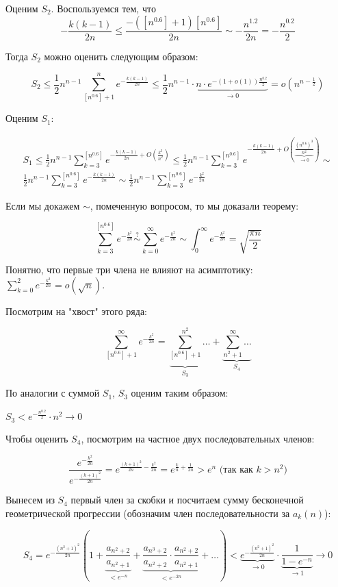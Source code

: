 Оценим $S_2$. Воспользуемся тем, что 
$$
-\frac{k(k - 1)}{2n} \leqslant \frac{-([n^{0.6}] + 1) [n^{0.6}]}{2n} \sim
-\frac{n^{1.2}}{2n} = -\frac{n^{0.2}}{2}
$$

Тогда $S_2$ можно оценить следующим образом:

$$
S_2 \leqslant \frac{1}{2} n^{n - 1} \sum_{[n^{0.6}] + 1}^{n} 
e^{-\frac{k(k - 1)}{2n}} \leqslant
\frac{1}{2} n^{n - 1} \cdot
\underbrace{n \cdot e^{-(1 + o(1)) \frac{n^{0.2}}{2}}}_{\to 0} 
= o \left( n^{n - \frac{1}{2}} \right)
$$

Оценим $S_1$:

\begin{multline*}
S_1 \leqslant \frac{1}{2} n^{n - 1} \sum_{k = 3}^{[n^{0.6}]}
e^{-\frac{k(k - 1)}{2n} + O \left( \frac{k^3}{n^2} \right)} \leqslant
\frac{1}{2} n^{n - 1} \sum_{k = 3}^{[n^{0.6}]}
e^{-\frac{k(k - 1)}{2n} + 
O \left( \underbrace{\frac{(n^{0.6})^3}{n^2}}_{\to 0} \right)} \sim \\
\frac{1}{2} n^{n - 1} \sum_{k = 3}^{[n^{0.6}]} e^{-\frac{k(k - 1)}{2n}} \sim
\frac{1}{2} n^{n - 1} \sum_{k = 3}^{[n^{0.6}]} e^{-\frac{k^2}{2n}}
\end{multline*}

Если мы докажем $\sim$, помеченную вопросом, то мы доказали теорему:

$$
\sum_{k = 3}^{[n^{0.6}]} e^{-\frac{k^2}{2n}} \overset{?}{\sim} 
\sum_{k = 0}^{\infty} e^{-\frac{k^2}{2n}} \sim
\int_{0}^{\infty} e^{-\frac{k^2}{2n}} = \sqrt{\frac{\pi n}{2}}
$$

Понятно, что первые три члена не влияют на асимптотику:
$\sum \limits_{k = 0}^2 e^{-\frac{k^2}{2n}} = o(\sqrt{n})$.

Посмотрим на "хвост" этого ряда:

$$
\sum_{[n^{0.6}] + 1}^{\infty} e^{-\frac{k^2}{2n}} = 
\underbrace{\sum_{[n^{0.6}] + 1}^{n^2}}_{S_3} \ldots + 
\underbrace{\sum_{n^2 + 1}^{\infty} \ldots}_{S_4}
$$

По аналогии с суммой $S_1$, $S_3$ оценим таким образом:

$S_3 < e^{-\frac{n^{0.2}}{2}} \cdot n^2 \to 0$

Чтобы оценить $S_4$, посмотрим на частное двух последовательных членов:

$$
\frac{e^{-\frac{k^2}{2n}}}{e^{-\frac{(k + 1)^2}{2n}}} = 
e^{\frac{(k + 1)^2}{2n} - \frac{k^2}{2n}} = 
e^{\frac{k}{n} + \frac{1}{2n}} > e^n \text{ (так как } k > n^2 \text{)}
$$

Вынесем из $S_4$ первый член за скобки и посчитаем сумму 
бесконечной геометрической прогрессии
(обозначим член последовательности за $a_k(n)$):

$$
S_4 = e^{-\frac{(n^2 + 1)^2}{2n}}
\left( 1 + \underbrace{\frac{a_{n^2 + 2}}{a_{n^2 + 1}}}_{ < e^{-n}} + 
\underbrace{\frac{a_{n^3 + 2}}{a_{n^2 + 2}} 
\cdot \frac{a_{n^2 + 2}}{a_{n^2 + 1}}}_{ < e^{-2n}}
+ \ldots \right) <
\underbrace{e^{-\frac{(n^2 + 1)^2}{2n}}}_{\to 0}
\cdot \underbrace{\frac{1}{1 - e^{-n}}}_{\to 1} \to 0
$$